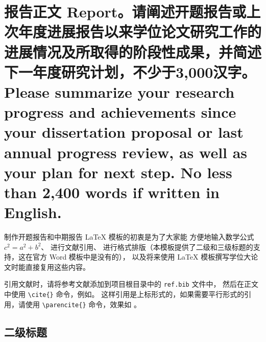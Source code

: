 \documentclass[a4paper,zihao=-4,AutoFakeBold]{ctexart}
\begin{document}
\vspace{-12pt}

\kaishu
\linespread{1.75}\selectfont

\makeatletter
{}
\makeatother




\section{报告正文 Report。\mdseries 请阐述开题报告或上次年度进展报告以来学位论文研究工作的进展情况及所取得的阶段性成果，并简述下一年度研究计划，不少于3,000汉字。Please summarize your research progress and achievements since your dissertation proposal or last annual progress review, as well as your plan for next step. No less than 2,400 words if written in English.}

制作开题报告和中期报告 \LaTeX{} 模板的初衷是为了大家能
方便地输入数学公式 $c^2 = a^2 + b^2$、
进行文献引用\cite{ZJSD}、
进行格式排版（本模板提供了二级和三级标题的支持，这在官方 Word 模板中是没有的），
以及将来使用 \LaTeX{} 模板撰写学位大论文时能直接复用这些内容。


引用文献时，请将参考文献添加到项目根目录中的 \texttt{ref.bib} 文件中，
然后在正文中使用 \verb|\cite{}| 命令，例如\cite{SPDZ}。
这样引用是上标形式的，如果需要平行形式的引用，请使用
\verb|\parencite{}| 命令，效果如 \parencite{SPDZ}。


\subsection{二级标题}\label{sub}
\end{document}
